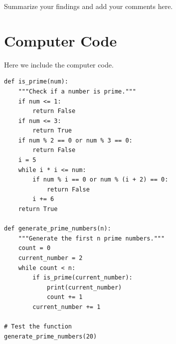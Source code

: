 \documentclass{article}
\begin{document}
Summarize your findings and add your comments here.


\newpage

\appendix

\section{Computer Code}

Here we include the computer code.

\begin{lstlisting}[style=pythonstyle, caption=Demo, label=lst:python1]
def is_prime(num):
    """Check if a number is prime."""
    if num <= 1:
        return False
    if num <= 3:
        return True
    if num % 2 == 0 or num % 3 == 0:
        return False
    i = 5
    while i * i <= num:
        if num % i == 0 or num % (i + 2) == 0:
            return False
        i += 6
    return True

def generate_prime_numbers(n):
    """Generate the first n prime numbers."""
    count = 0
    current_number = 2
    while count < n:
        if is_prime(current_number):
            print(current_number)
            count += 1
        current_number += 1

# Test the function
generate_prime_numbers(20)
\end{lstlisting}
\end{document}
